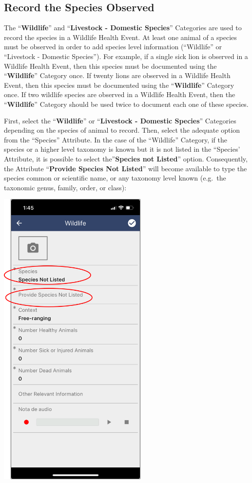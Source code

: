 \documentclass[
  letterpaper,
  DIV=11,
  numbers=noendperiod]{scrreprt}
\begin{document}
\hypertarget{record-the-species-observed}{%
\subsection*{Record the Species
Observed}\label{record-the-species-observed}}

The ``\textbf{Wildlife}'' and ``\textbf{Livestock - Domestic Species}''
Categories are used to record the species in a Wildlife Health Event. At
least one animal of a species must be observed in order to add species
level information (``Wildlife'' or ``Livestock - Domestic Species'').
For example, if a single sick lion is observed in a Wildlife Health
Event, then this species must be documented using the
``\textbf{Wildlife}'' Category once. If twenty lions are observed in a
Wildlife Health Event, then this species must be documented using the
``\textbf{Wildlife}'' Category once. If two wildlife species are
observed in a Wildlife Health Event, then the ``\textbf{Wildlife}''
Category should be used twice to document each one of these species.

First, select the ``\textbf{Wildlife}'' or ``\textbf{Livestock -
Domestic Species}'' Categories depending on the species of animal to
record. Then, select the adequate option from the ``Species'' Attribute.
In the case of the ``Wildlife'' Category, if the species or a higher
level taxonomy is known but it is not listed in the ``Species'
Attribute, it is possible to select the''\textbf{Species not Listed}''
option. Consequently, the Attribute ``\textbf{Provide Species Not
Listed}'' will become available to type the species common or scientific
name, or any taxonomy level known (e.g.~the taxonomic genus, family,
order, or class):

\includegraphics[width=2.91667in,height=\textheight]{Pictures_for_manual/Picture8.png}
\end{document}
